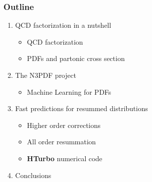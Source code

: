 \documentclass[aspectratio=43]{beamer}
\begin{document}
\begin{frame}

	\frametitle{Outline}
	
	\begin{enumerate}
		\item {\color{blue}QCD factorization in a nutshell}
		\begin{itemize}
			\item QCD factorization
			\item PDFs and partonic cross section
		\end{itemize}
		\item {\color{blue}The N3PDF project}
		\begin{itemize}	
			\item Machine Learning for PDFs
		\end{itemize}	
		\item {\color{blue}Fast predictions for resummed distributions}
		\begin{itemize}
			\item Higher order corrections
			\item All order resummation
			\item \textbf{HTurbo} numerical code
		\end{itemize}
		\item {\color{blue}Conclusions}
	\end{enumerate}
	
\end{frame}

\begin{frame}


\end{frame}
\end{document}
